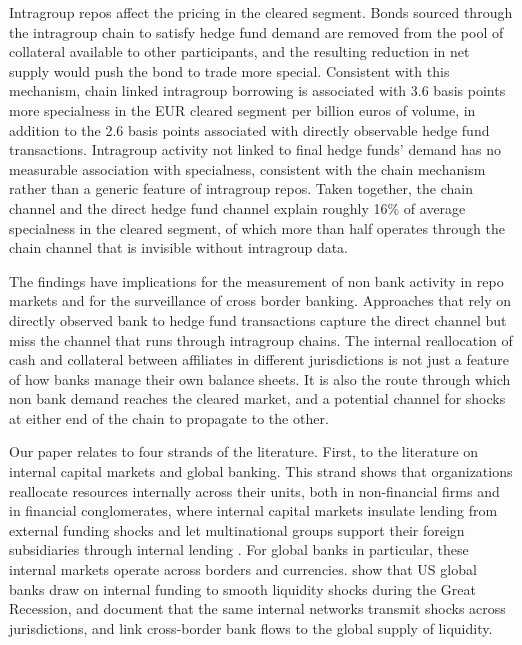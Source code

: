 \documentclass[english, 11pt, oneside, legal]{article}
\begin{document}
Intragroup repos affect the pricing in the cleared segment. Bonds sourced through the intragroup chain to satisfy hedge fund demand are removed from the pool of collateral available to other participants, and the resulting reduction in net supply would push the bond to trade more special. Consistent with this mechanism, chain linked intragroup borrowing is associated with 3.6 basis points more specialness in the EUR cleared segment per billion euros of volume, in addition to the 2.6 basis points associated with directly observable hedge fund transactions. Intragroup activity not linked to final hedge funds' demand has no measurable association with specialness, consistent with the chain mechanism rather than a generic feature of intragroup repos. Taken together, the chain channel and the direct hedge fund channel explain roughly 16\% of average specialness in the cleared segment, of which more than half operates through the chain channel that is invisible without intragroup data.

The findings have implications for the measurement of non bank activity in repo markets and for the surveillance of cross border banking. Approaches that rely on directly observed bank to hedge fund transactions capture the direct channel but miss the channel that runs through intragroup chains. The internal reallocation of cash and collateral between affiliates in different jurisdictions is not just a feature of how banks manage their own balance sheets. It is also the route through which non bank demand reaches the cleared market, and a potential channel for shocks at either end of the chain to propagate to the other.

Our paper relates to four strands of the literature. First, to the literature on internal capital markets and global banking. This strand shows that organizations reallocate resources internally across their units, both in non-financial firms \citep{stein1997} and in financial conglomerates, where internal capital markets insulate lending from external funding shocks \citep{campello2002} and let multinational groups support their foreign subsidiaries through internal lending \citep{deHaas2010}. For global banks in particular, these internal markets operate across borders and currencies. \citet{cetorelli2012} show that US global banks draw on internal funding to smooth liquidity shocks during the Great Recession, \citet{cetorelli2012a} and \citet{cetorelli2011} document that the same internal networks transmit shocks across jurisdictions, and \citet{brunoshin2015} link cross-border bank flows to the global supply of liquidity. 
\end{document}
